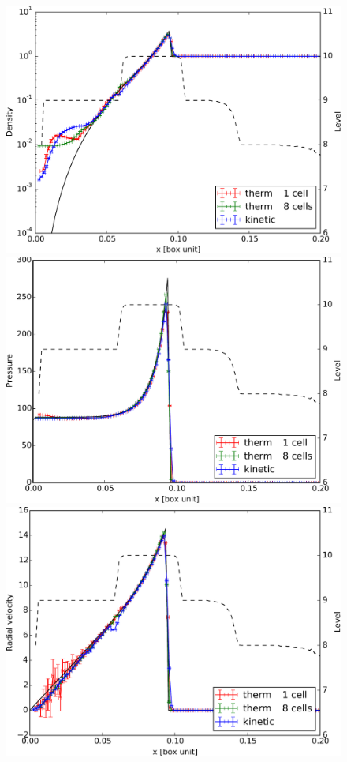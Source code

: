 \begin{figure}[bth]
\begin{minipage}[c]{.46\linewidth}
   \end{minipage} \hfill
   \begin{minipage}[c]{.46\linewidth}
		
		\includegraphics[width=\textwidth]{img/03/sedov/sedov_comp_profile_den.pdf} 
		\includegraphics[width=\textwidth]{img/03/sedov/sedov_comp_profile_pres.pdf} 
		\includegraphics[width=\textwidth]{img/03/sedov/sedov_comp_profile_vel.pdf} 


\end{minipage}
\end{figure}
